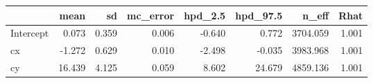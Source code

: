 \begin{tabular}{lrrrrrrr}
\toprule
{} &   mean &    sd &  mc\_error &  hpd\_2.5 &  hpd\_97.5 &    n\_eff &  Rhat \\
\midrule
Intercept &  0.073 & 0.359 &     0.006 &   -0.640 &     0.772 & 3704.059 & 1.001 \\
cx        & -1.272 & 0.629 &     0.010 &   -2.498 &    -0.035 & 3983.968 & 1.001 \\
cy        & 16.439 & 4.125 &     0.059 &    8.602 &    24.679 & 4859.136 & 1.001 \\
\bottomrule
\end{tabular}
